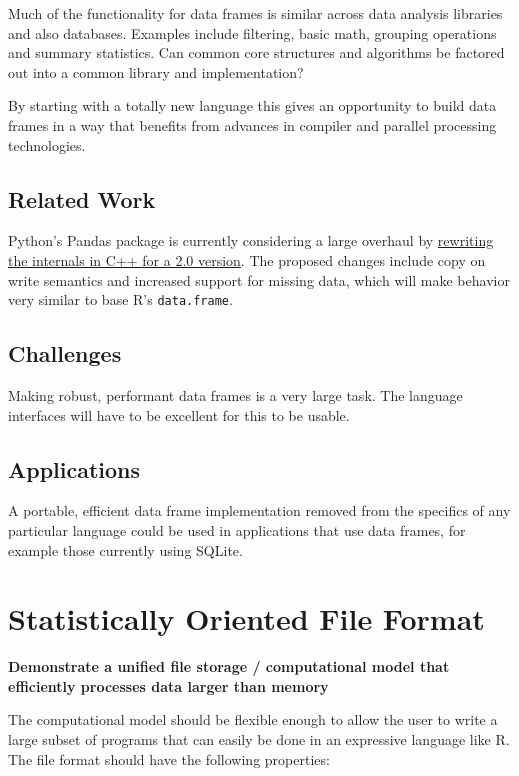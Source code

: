 \documentclass[12pt]{article}
\begin{document}
Much of the functionality for data frames is similar across data analysis
libraries and also databases. Examples include filtering, basic math,
grouping operations and summary statistics. Can common core structures
and algorithms be factored out into a common library and implementation?

By starting with a totally new language this gives an opportunity to build
data frames in a way that benefits from advances in compiler and
parallel processing technologies.

\subsection{Related Work}

Python's Pandas package is currently considering a large overhaul by
\href{https://pandas-dev.github.io/pandas2/internal-architecture.html#building-libpandas-in-c-11-14-for-lowest-level-implementation-tier}{rewriting
the internals in C++ for a 2.0 version}. The proposed changes include
copy on write semantics and increased support for missing data, which will
make behavior very similar to base R's \texttt{data.frame}.

\subsection{Challenges}

Making robust, performant data frames is a very large task. The language
interfaces will have to be excellent for this to be usable.

\subsection{Applications}

A portable, efficient data frame implementation removed from the specifics
of any particular language could be used in applications that use
data frames, for example those currently using SQLite.

\section{Statistically Oriented File Format}

\textbf{Demonstrate a unified file storage / computational model
that efficiently processes data larger than memory}

The computational model should be flexible enough to allow the user to
write a large subset of programs that can easily be done in an expressive
language like R.  The file format should have the following properties:
\end{document}
